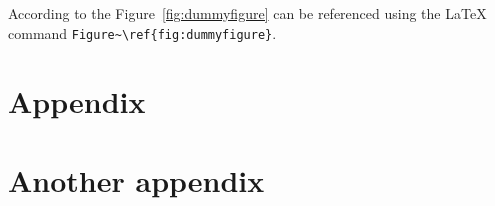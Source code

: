 \documentclass[12pt,a4paper,oneside,finnish,main=english]{tut-thesis}
\begin{document}
\blindtext %

According to \textcite{Doe2015} the Figure~\ref{fig:dummyfigure} can be referenced using the \LaTeX{} command \verb|Figure~\ref{fig:dummyfigure}|.
\blindmathpaper %

\printbibliography[heading=bibintoc,title=References]

\begin{appendices}
\chapter{Appendix}
\blindtext %
\chapter{Another appendix}
\blindtext
\end{appendices}
\end{document}
